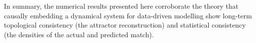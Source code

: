 
In summary, the numerical results presented here corroborate the theory that causally embedding a dynamical system for data-driven modelling show long-term topological consistency (the attractor reconstruction) and statistical consistency (the densities of the actual and predicted match).